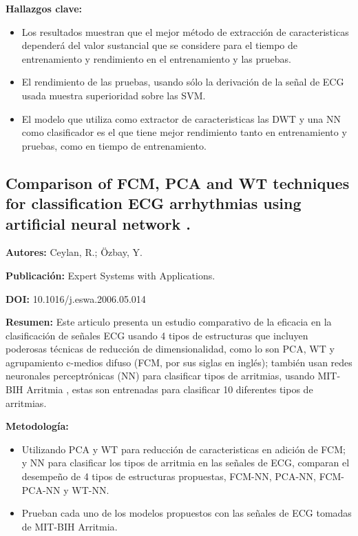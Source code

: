 \documentclass[12pt,letterpaper,oneside,openright]{book}
\begin{document}
\textbf{Hallazgos clave:}
\begin{itemize}
	\item Los resultados muestran que el mejor método de extracción de caracteristicas dependerá del valor sustancial que se considere para el tiempo de entrenamiento y rendimiento en el entrenamiento y las pruebas.
	\item El rendimiento de las pruebas, usando sólo la derivación  de la señal de ECG usada muestra superioridad sobre las SVM.
	\item El modelo que utiliza como extractor de caracteristicas las DWT y una NN como clasificador es el que tiene mejor rendimiento tanto en entrenamiento y pruebas, como en tiempo de entrenamiento.
\end{itemize}

\subsection{Comparison of FCM, PCA and WT techniques for classification ECG arrhythmias using artificial neural network \cite{Ceylan07}.}

\textbf{Autores:} Ceylan, R.; Özbay, Y.

\textbf{Publicación:} Expert Systems with Applications.

\textbf{DOI:} 10.1016/j.eswa.2006.05.014

\textbf{Resumen:} Este articulo presenta un estudio comparativo de la eficacia en la clasificación de señales ECG usando 4 tipos de estructuras que incluyen poderosas técnicas de reducción de dimensionalidad, como lo son PCA, WT y agrupamiento c-medios difuso (FCM, por sus siglas en inglés); también usan redes neuronales perceptrónicas (NN) para clasificar tipos de arritmias, usando MIT-BIH Arritmia \cite{arritmiadb}, estas son entrenadas para clasificar 10 diferentes tipos de arritmias. 

\textbf{Metodología:}
\begin{itemize}
	\item Utilizando PCA y WT para reducción de caracteristicas en adición de FCM; y NN para clasificar los tipos de arritmia en las señales de ECG, comparan el desempeño de 4 tipos de estructuras propuestas, FCM-NN, PCA-NN, FCM-PCA-NN y WT-NN.
	\item Prueban cada uno de los modelos propuestos con las señales de ECG tomadas de MIT-BIH Arritmia\cite{arritmiadb}.
\end{itemize}
\end{document}
